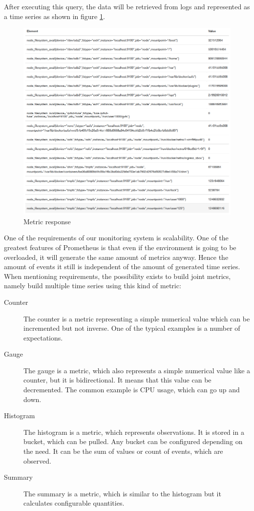 After executing this query, the data will be retrieved from logs and represented as a time series as shown in figure \ref{fig:monitoring_req}.



\begin{figure}[H]
\begin{center}
  \includegraphics[width=\linewidth]{components/3/monitoring_req.png}
  \caption{Metric response}
  \label{fig:monitoring_req}
\end{center}
\end{figure}

One of the requirements of our monitoring system is scalability. One of the greatest features of Prometheus is that even if the environment is going to be overloaded, it will generate the same amount of metrics anyway. Hence the amount of events it still is independent of the amount of generated time series. 
When mentioning requirements, the possibility exists to build joint metrics, namely build multiple time series using this kind of metric:

\begin{description}
\item[Counter] The counter is a metric representing a simple numerical value which can be incremented but not inverse. One of the typical examples is a number of expectations. 
\item[Gauge] The gauge is a metric, which also represents a simple numerical value like a counter, but it is bidirectional. It means that this value can be decremented. The common example is CPU usage, which can go up and down.
\item[Histogram] The histogram is a metric, which represents observations. It is stored in a bucket, which can be pulled. Any bucket can be configured depending on the need. It can be the sum of values or count of events, which are observed.
\item[Summary] The summary is a metric, which is similar to the histogram but it calculates configurable quantities. 
\end{description}

